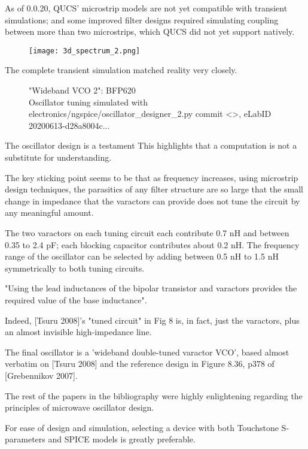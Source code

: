 \documentclass[paper.tex]{subfiles}
\begin{document}
As of 0.0.20, QUCS' microstrip models are not yet compatible with transient simulations; and some improved filter designs required simulating coupling between more than two microstrips, which QUCS did not yet support natively.

\begin{figure}[H]
\texttt{[image: 3d\_spectrum\_2.png]}
\end{figure}

The complete transient simulation matched reality very closely. 

\begin{figure}[H]
	
 	\caption{"Wideband VCO 2": BFP620  \\
 	 Oscillator tuning simulated with electronics/ngspice/oscillator\_designer\_2.py commit <>, eLabID 20200613-d28a8004c...}
\end{figure}


The oscillator design is a testament  This highlights that a computation is not a substitute for understanding.

The key sticking point seems to be that as frequency increases, using microstrip design techniques, the parasitics of any filter structure are so large that the small change in impedance that the varactors can provide does not tune the circuit by any meaningful amount.

The two varactors on each tuning circuit each contribute 0.7 nH and between 0.35 to 2.4 pF; each blocking capacitor contributes about 0.2 nH. The frequency range of the oscillator can be selected by adding between 0.5 nH to 1.5 nH symmetrically to both tuning circuits. 

"Using the lead inductances of the bipolar transistor and varactors provides the required value of the base inductance".

Indeed, [Tsuru 2008]'s "tuned circuit" in Fig 8 is, in fact, just the varactors, plus an almost invisible high-impedance line.


The final oscillator is a 'wideband double-tuned varactor VCO', based almost verbatim on [Tsuru 2008] and the reference design in Figure 8.36, p378 of [Grebennikov 2007]. 



The rest of the papers in the bibliography were highly enlightening regarding the principles of microwave oscillator design.

For ease of design and simulation, selecting a device with both Touchstone S-parameters and SPICE models is greatly preferable.
\end{document}
